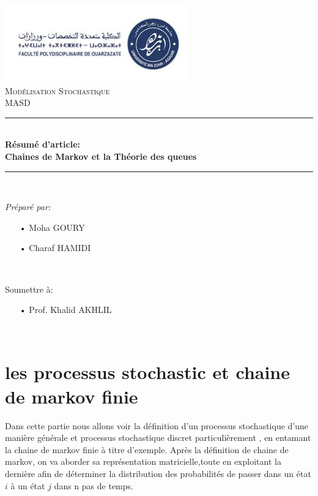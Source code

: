 \documentclass[a4paper,12pt]{report}
\begin{document}
\begin{titlepage}
\newcommand{\HRule}{\rule{\linewidth}{0.5mm}} 
\centering
\includegraphics[width=8cm]{fpo.jpg}\\[1cm] 
\center 
\textsc{\LARGE Modélisation Stochastique}\\[1.5cm]
\textsc{\Large MASD}\\[0.5cm] 
\makeatletter
\HRule \\[0.9cm]
{ \large \bfseries Résumé d'article:
\\
Chaines de Markov et la Théorie des queues
}\\[0.4cm] 
\HRule \\[2cm]
\begin{minipage}{0.4\textwidth}
\begin{flushleft} 
\emph{Préparé par:}
\begin{itemize}
\item[•] Moha GOURY
\item[•] Charaf HAMIDI
\end{itemize}
\end{flushleft}
\end{minipage}
~
\begin{minipage}{0.4\textwidth}
\begin{flushright}
Soumettre à:
\begin{itemize}
\item[•]Prof. Khalid AKHLIL
\end{itemize}
\end{flushright}
\end{minipage}\\[2cm]
\makeatother
\vfill 
\end{titlepage}

\tableofcontents
\fancyhead{} 
\newpage
\section{les processus stochastic et chaine de markov finie}
Dans cette partie nous allons voir la définition d'un processus stochastique d'une manière générale et processus stochastique discret particulièrement  , en entamant la chaine de markov finie à titre d'exemple.
Après la définition de chaine de markov, on va aborder sa représentation matricielle,toute en exploitant la dernière afin de déterminer la distribution des probabilités de passer dans un état $i$ à un état $j$ dans n pas de temps.
\end{document}
